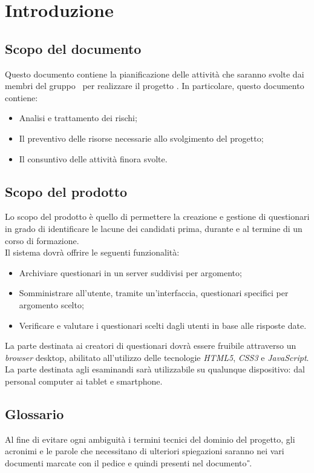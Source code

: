 \section{Introduzione}
\subsection{Scopo del documento}
Questo documento contiene la pianificazione delle attività che saranno svolte dai membri del gruppo \gruppo\ per realizzare il progetto \progetto. In particolare, questo documento contiene:

	\begin{itemize}
		\item Analisi e trattamento dei rischi;
		\item Il preventivo delle risorse necessarie allo svolgimento del progetto;
		\item Il consuntivo delle attività finora svolte.
	\end{itemize}
	
\subsection{Scopo del prodotto}
Lo scopo del prodotto è quello di permettere la creazione e gestione di questionari in grado di identificare le lacune dei candidati prima, durante e al termine di un corso di formazione. 
\\Il sistema dovrà offrire le seguenti funzionalità:
\begin{itemize}
	\item
	Archiviare questionari in un server suddivisi per argomento;
	\item
	Somministrare all'utente, tramite un'interfaccia, questionari specifici per argomento scelto;
	\item
	Verificare e valutare i questionari scelti dagli utenti in base alle risposte date.
\end{itemize}
La parte destinata ai creatori di questionari dovrà essere fruibile attraverso un \textit{browser} desktop, abilitato all'utilizzo delle tecnologie \textit{HTML5}, \textit{CSS3} e \textit{JavaScript}. La parte destinata agli esaminandi sarà utilizzabile su qualunque dispositivo: dal personal computer ai tablet e smartphone.

\subsection{Glossario}
Al fine di evitare ogni ambiguità i termini tecnici del dominio del progetto, gli acronimi e le parole che necessitano di ulteriori spiegazioni saranno nei vari documenti marcate con il pedice  e quindi presenti nel documento \textit{\G}.
